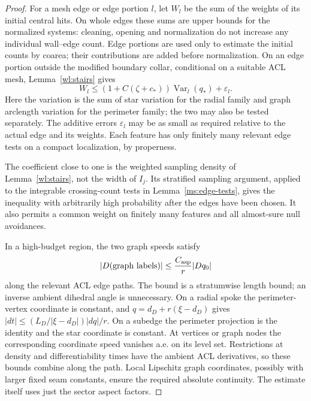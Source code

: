 \documentclass[11pt]{article}
\numberwithin{equation}{section}
\theoremstyle{definition}
\theoremstyle{remark}
\begin{document}
\begin{proof}
For a mesh edge or edge portion $l$, let $W_l$ be the sum of the
weights of its initial central hits.  On whole edges these sums
are upper bounds for the normalized systems: cleaning, opening and
normalization do not increase any individual wall--edge count.
Edge portions are used only to estimate the initial counts by
coarea; their contributions are added before normalization.
On an edge portion outside the modified
boundary collar, conditional on a suitable ACL mesh,
Lemma~\ref{wl:stairs} gives
\begin{equation}\label{ha:weighted-coarea}
 W_l\le(1+C(\zeta+c_*))\operatorname{Var}_l(q_*)+\varepsilon_l.
\end{equation}
Here the variation is the sum of star variation for the radial family
and graph arclength variation for the perimeter family; the two may
also be tested separately.  The additive errors $\varepsilon_l$ may
be as small as required relative to the actual edge and its weights.
Each feature has only finitely many relevant edge tests on a compact
localization, by properness.

The coefficient close to one is the weighted sampling density of
Lemma~\ref{wl:stairs}, not the width of $I_j$.  Its stratified
sampling argument, applied to the integrable crossing-count tests
in Lemma~\ref{ms:edge-tests}, gives the inequality with arbitrarily
high probability after the edges have been chosen.  It also permits
a common weight on finitely many features and all almost-sure null
avoidances.

In a high-budget region, the two graph speeds satisfy
\begin{equation}\label{ha:graph-speed}
                 |D(\hbox{graph labels})|
                    \le \frac{C_{\mathrm{asp}}}{r}|Dq_0|
\end{equation}
along the relevant ACL edge paths.  The bound is a stratumwise length
bound; an inverse ambient dihedral angle is unnecessary.  On a radial
spoke the perimeter-vertex coordinate is constant, and
$q=d_D+r(\xi-d_D)$ gives
$|dt|\le (L_D/|\xi-d_D|)|dq|/r$.  On a subedge the perimeter
projection is the identity and the star coordinate is constant.
At vertices or graph nodes the corresponding coordinate speed
vanishes a.e. on its level set.  Restrictions at density and
differentiability times have the ambient ACL derivatives, so these
bounds combine along the path.  Local Lipschitz graph coordinates,
possibly with larger fixed seam constants, ensure the required
absolute continuity.  The estimate itself uses just the sector
aspect factors.


\end{proof}
\end{document}
